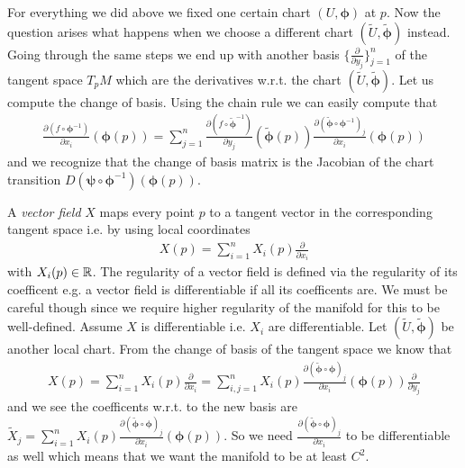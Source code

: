 \documentclass[../main.tex]{subfiles}
\begin{document}
For everything we did above we fixed one certain chart $(U,\boldsymbol{\phi})$ at $p$.
Now the question arises what happens when we choose a different chart 
$(\tilde{U}, \tilde{\boldsymbol{\phi}})$ instead.
Going through the same steps we end up with another basis 
$\{ \frac{\partial}{\partial y_j} \}_{j=1}^n$ of the tangent space $T_p M$
which are the derivatives w.r.t. the chart 
$(\tilde{U}, \tilde{\boldsymbol{\phi}})$. 
Let us compute the change of basis.
Using the chain rule 
we can easily compute that 
\begin{align*}
    \frac{\partial (f \circ \boldsymbol{\phi}^{-1})}{\partial x_i} (\boldsymbol{\phi}(p))
    =\sum_{j=1}^n \frac{\partial (f \circ \tilde{\boldsymbol{\phi}}^{-1})}{\partial y_j} (\tilde{\boldsymbol{\phi}}(p))
        \frac{\partial (\tilde{\boldsymbol{\phi}} \circ \boldsymbol{\phi}^{-1})_j}{\partial x_i}(\boldsymbol{\phi}(p)) 
\end{align*}
and we recognize that the change of basis matrix is the Jacobian of 
the chart transition $D(\bm{\psi} \circ \boldsymbol{\phi}^{-1})(\boldsymbol{\phi}(p))$.

A \textit{vector field} $X$ maps every point $p$ to a tangent vector 
in the corresponding tangent space i.e. by using local coordinates
\begin{align*}
    X(p) = \sum_{i=1}^n X_i(p) \frac{\partial}{\partial x_i}
\end{align*}
with $X_i(p) \in \mathbb{R}$. The regularity of a vector field is defined via the
regularity of its coefficent e.g. a vector field is differentiable if 
all its coefficents are. We must be careful though since we require higher 
regularity of the manifold for this to be well-defined. 
Assume $X$ is differentiable i.e. $X_i$ are differentiable. 
Let $(\tilde{U}, \tilde{\bm{\phi}})$ 
be another local chart.
From the 
change of basis of the tangent space we know that 
\begin{align*}
    X(p) = \sum_{i=1}^n X_i(p) \frac{\partial}{\partial x_i}
    = \sum_{i,j=1}^n X_i(p) \frac{\partial (\tilde{\boldsymbol{\phi}} 
        \circ \boldsymbol{\phi})_j}{\partial x_i}(\boldsymbol{\phi}(p))
        \frac{\partial}{\partial y_j}
\end{align*}
and we see the coefficents w.r.t. to the new basis are 
$\tilde{X}_j = \sum_{i=1}^n X_i(p) \frac{\partial (\tilde{\boldsymbol{\phi}} 
\circ \boldsymbol{\phi})_j}{\partial x_i}(\boldsymbol{\phi}(p))$.
So we need $\frac{\partial (\tilde{\boldsymbol{\phi}} \circ \boldsymbol{\phi})_j}{\partial x_i}$ to be 
differentiable as well which means that we want the manifold to be at least $C^2$.
\end{document}
